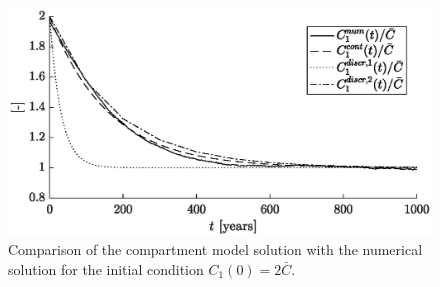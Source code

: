 \begin{figure}[!htp]
	\centering
	\includegraphics[scale=1]{fig/problem2box/C1vsC1tilde1_1000years2.eps}
	\caption{Comparison of the compartment model solution with the numerical solution for the initial condition $C_1(0) = 2\bar C$.}
	\label{fig:comparison_comp-real1}
\end{figure}